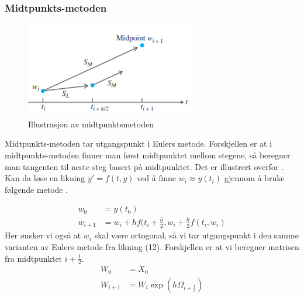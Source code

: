 \subsubsection{Midtpunkts-metoden}
\begin{figure}[!ht]
\begin{center}
\includegraphics{rapport/teori/bilder/midpoint.PNG}
\caption{Illustrasjon av midtpunktsmetoden}
\label{fig:rotasjon}
\end{center}
\end{figure}\newline\newline
Midtpunkts-metoden tar utgangspunkt i Eulers metode. Forskjellen er at i midtpunkts-metoden finner man først midtpunktet mellom stegene, så beregner man tangenten til neste steg basert på midtpunktet. Det er illustrert overfor \cite{MATEMATIKK:1}.\newline\newline
Kan da løse en likning $y' = f(t, y)$ ved å finne $w_i \approx y(t_i)$ gjennom å bruke følgende metode \cite{MATEMATIKK:1}.

\begin{equation}
\begin{aligned}
    w_0&=y(t_0)\\
    w_{i+1}&=w_i + hf(t_i+\frac{h}{2}, w_i+\frac{h}{2}f(t_i, w_i)
\end{aligned}
\end{equation}
Her ønsker vi også at $w_i$ skal være ortogonal, så vi tar utgangspunkt i den samme varianten av Eulers metode fra likning (12). Forskjellen er at vi beregner matrisen fra midtpunktet $i+\frac{1}{2}$.
\begin{equation}
\begin{aligned}
    W_0&=X_0\\
    W_{i+1}&=W_i\exp(h\Omega_{i+\frac{1}{2}})
\end{aligned}
\end{equation}


